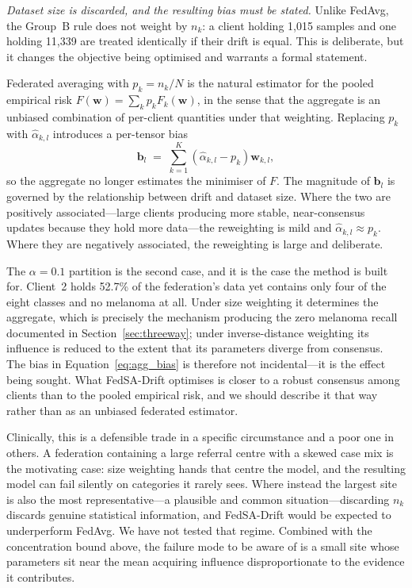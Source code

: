 \documentclass{ieeeaccess}
\newcommand{\sadrift}{FedSA-Drift}
\begin{document}
\emph{Dataset size is discarded, and the resulting bias must be stated.} Unlike FedAvg, the Group~B rule does not weight by $n_k$: a client holding 1,015 samples and one holding 11,339 are treated identically if their drift is equal. This is deliberate, but it changes the objective being optimised and warrants a formal statement.

Federated averaging with $p_k = n_k/N$ is the natural estimator for the pooled empirical risk $F(\mathbf{w}) = \sum_k p_k F_k(\mathbf{w})$, in the sense that the aggregate is an unbiased combination of per-client quantities under that weighting. Replacing $p_k$ with $\hat{\alpha}_{k,l}$ introduces a per-tensor bias
\begin{equation}
\label{eq:agg_bias}
\mathbf{b}_l \;=\; \sum_{k=1}^{K} \left(\hat{\alpha}_{k,l} - p_k\right)\mathbf{w}_{k,l},
\end{equation}
so the aggregate no longer estimates the minimiser of $F$. The magnitude of $\mathbf{b}_l$ is governed by the relationship between drift and dataset size. Where the two are positively associated---large clients producing more stable, near-consensus updates because they hold more data---the reweighting is mild and $\hat{\alpha}_{k,l} \approx p_k$. Where they are negatively associated, the reweighting is large and deliberate.

The $\alpha{=}0.1$ partition is the second case, and it is the case the method is built for. Client~2 holds 52.7\% of the federation's data yet contains only four of the eight classes and no melanoma at all. Under size weighting it determines the aggregate, which is precisely the mechanism producing the zero melanoma recall documented in Section~\ref{sec:threeway}; under inverse-distance weighting its influence is reduced to the extent that its parameters diverge from consensus. The bias in Equation~\eqref{eq:agg_bias} is therefore not incidental---it is the effect being sought. What \sadrift{} optimises is closer to a robust consensus among clients than to the pooled empirical risk, and we should describe it that way rather than as an unbiased federated estimator.

Clinically, this is a defensible trade in a specific circumstance and a poor one in others. A federation containing a large referral centre with a skewed case mix is the motivating case: size weighting hands that centre the model, and the resulting model can fail silently on categories it rarely sees. Where instead the largest site is also the most representative---a plausible and common situation---discarding $n_k$ discards genuine statistical information, and \sadrift{} would be expected to underperform FedAvg. We have not tested that regime. Combined with the concentration bound above, the failure mode to be aware of is a small site whose parameters sit near the mean acquiring influence disproportionate to the evidence it contributes.
\end{document}
